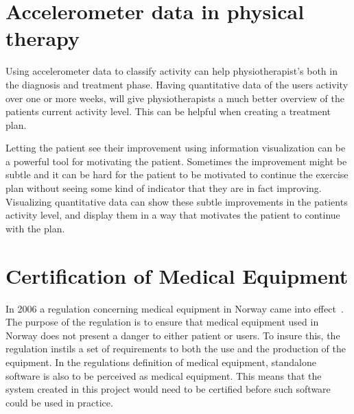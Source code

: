 \section{Accelerometer data in physical therapy}
Using accelerometer data to classify activity can help physiotherapist's both in the diagnosis and treatment phase. Having quantitative data of the users activity over one or more weeks, will give physiotherapists a much better overview of the patients current activity level. This can be helpful when creating a treatment plan.

Letting the patient see their improvement using information visualization can be a powerful tool for motivating the patient. Sometimes the improvement might be subtle and it can be hard for the patient to be motivated to continue the exercise plan without seeing some kind of indicator that they are in fact improving. Visualizing quantitative data can show these subtle improvements in the patients activity level, and display them in a way that motivates the patient to continue with the plan.  

\section{Certification of Medical Equipment}
\label{sec:medicalEquipment}
In 2006 a regulation concerning medical equipment in Norway came into effect~\cite{medicalEquipment}. The purpose of the regulation is to ensure that medical equipment used in Norway does not present a danger to either patient or users. To insure this, the regulation instils a set of requirements to both the use and the production of the equipment. In the regulations definition of medical equipment, standalone software is also to be perceived as medical equipment. This means that the system created in this project would need to be certified before such software could be used in practice. 
